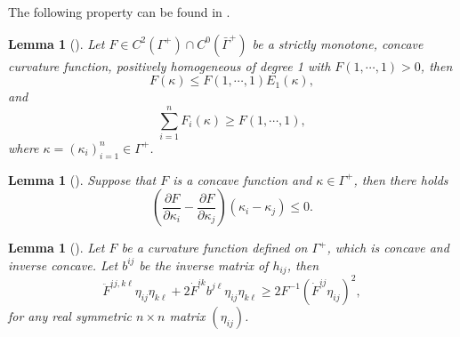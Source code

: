 \documentclass[11pt,reqno]{amsart}
\newtheorem{lem}[thm]{Lemma}
\theoremstyle{definition}
\theoremstyle{remark}
\newtheorem{rem}{Remark}
\numberwithin{equation}{section}
\renewcommand{\(}{\left(}
\renewcommand{\)}{\right)}
\renewcommand{\-}{\overline}
\begin{document}
The following property can be found in \cite[Lemma 2.2.19, Lemma 2.2.20]{Ger06}.
\begin{lem}[\cite{Ger06}]
	Let $F\in C^2(\Gamma^{+})\cap C^0(\bar{\Gamma}^{+})$ be a strictly monotone, concave curvature function, positively homogeneous of degree 1 with $F(1,\cdots,1)>0$, then
	\begin{equation}\label{re-F-H}
		F(\kappa)\leq F(1,\cdots,1)E_1(\kappa),
	\end{equation}
and
\begin{equation}\label{sum-F}
	\sum_{i=1}^n F_i(\kappa)\geq F(1,\cdots,1),
\end{equation}
where $\kappa=(\kappa_i)_{i=1}^n\in\Gamma^{+}$.
\end{lem}

\begin{lem}[\cites{And1994,Ecker-Huisken89}]\label{lem-concave}
	Suppose that $F$ is a concave function and $\kappa\in\Gamma^{+}$, then there holds
	\begin{equation}
		\left(\frac{\partial F}{\partial\kappa_i}-\frac{\partial F}{\partial\kappa_j}\right)(\kappa_i-\kappa_j)\leq 0.
	\end{equation}
\end{lem}

\begin{lem}[\cite{Ger96}]\label{lem-ger96}
	Let $F$ be a curvature function defined on $\Gamma^{+}$, which is concave and inverse concave. Let $b^{ij}$ be the inverse matrix of $h_{ij}$, then
	\begin{equation}\label{pro-con-in}
		\ddot{F}^{ij,k\ell}\eta_{ij}\eta_{k\ell}+2\dot{F}^{ik}b^{j\ell}\eta_{ij}\eta_{k\ell}\geq 2F^{-1}(\dot{F}^{ij}\eta_{ij})^2,
	\end{equation}
for any real symmetric $n\times n$ matrix $(\eta_{ij})$. 
\end{lem}
\end{document}
